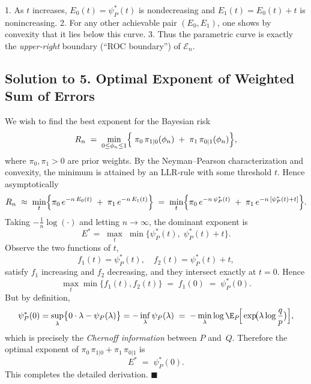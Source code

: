 \documentclass[11pt]{article}
\begin{document}
1.  As $t$ increases, $E_0(t)=\psi_P^*(t)$ is nondecreasing and $E_1(t)=E_0(t)+t$ is nonincreasing.
2.  For any other achievable pair $(E_0,E_1)$, one shows by convexity that it lies below this curve.
3.  Thus the parametric curve is exactly the {\em upper‐right} boundary (“ROC boundary”) of $\mathcal{E}_n$.

\bigskip

\subsection*{Solution to 5. Optimal Exponent of Weighted Sum of Errors}

We wish to find the best exponent for the Bayesian risk
\[
R_n \;=\;\min_{0\le\phi_n\le1}
\Bigl\{\;\pi_0\,\pi_{1|0}(\phi_n)\;+\;\pi_1\,\pi_{0|1}(\phi_n)\Bigr\},
\]
where $\pi_0,\pi_1>0$ are prior weights.  By the Neyman–Pearson characterization and convexity, the minimum is attained by an LLR‐rule with some threshold $t$.  Hence asymptotically
\[
R_n
\;\approx\;
\min_{t}
\Bigl\{\pi_0\,e^{-n\,E_0(t)} \;+\;\pi_1\,e^{-n\,E_1(t)}\Bigr\}
\;=\;
\min_{t}
\Bigl\{\pi_0\,e^{-n\,\psi_P^*(t)} \;+\;\pi_1\,e^{-n\,[\psi_P^*(t)+t]}\Bigr\}.
\]
Taking $-\tfrac1n\log(\cdot)$ and letting $n\to\infty$, the dominant exponent is
\[
E^*
=\;
\max_{t}\;\min\bigl\{\psi_P^*(t),\;\psi_P^*(t)+t\bigr\}.
\]
Observe the two functions of $t$,
\[
f_1(t)=\psi_P^*(t),\quad
f_2(t)=\psi_P^*(t)+t,
\]
satisfy $f_1$ increasing and $f_2$ decreasing, and they intersect exactly at $t=0$.  Hence
\[
\max_{t}\min\{f_1(t),f_2(t)\}
\;=\;
f_1(0)
\;=\;
\psi_P^*(0).
\]
But by definition,
\[
\psi_P^*(0)
=\sup_{\lambda}\bigl\{0\cdot\lambda - \psi_P(\lambda)\bigr\}
=-\inf_{\lambda}\psi_P(\lambda)
\;=\;
-\min_{\lambda}\log \E_P\!\Big[\exp\!\bigl(\lambda\log\frac{q}{p}\bigr)\Big],
\]
which is precisely the {\em Chernoff information} between $P$ and $Q$.  Therefore the optimal exponent of $\pi_0\,\pi_{1|0}+\pi_1\,\pi_{0|1}$ is
\[
\boxed{E^* \;=\;\psi_P^*(0).}
\]
This completes the detailed derivation.  \hfill\(\blacksquare\)
\end{document}
